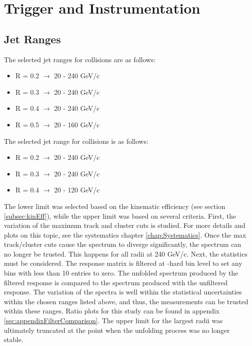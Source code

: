 \section{Trigger and Instrumentation}
\label{chap:TriggerAndInstrumentation}

\subsection{Jet \pT Ranges}
\label{sec:ptRanges}

The selected jet \pT ranges for \pp collisions are as follows:

\begin{itemize}
    \item R = 0.2 $\rightarrow$ 20 - 240 GeV/c
    \item R = 0.3 $\rightarrow$ 20 - 240 GeV/c
    \item R = 0.4 $\rightarrow$ 20 - 240 GeV/c
    \item R = 0.5 $\rightarrow$ 20 - 160 GeV/c
\end{itemize}

The selected jet \pT range for \pPb collisions is as follows:

\begin{itemize}
    \item R = 0.2 $\rightarrow$ 20 - 240 GeV/c
    \item R = 0.3 $\rightarrow$ 20 - 240 GeV/c
    \item R = 0.4 $\rightarrow$ 20 - 120 GeV/c
\end{itemize}

The lower limit was selected based on the kinematic efficiency (see section \ref{subsec:kinEff}), while the upper limit was based on several criteria. First, the variation of the maximum track and cluster \pT cuts is studied. For more details and plots on this topic, see the systematics chapter \ref{chap:Systematics}. Once the max track/cluster cuts cause the spectrum to diverge significantly, the spectrum can no longer be trusted. This happens for all radii at 240 GeV/c. Next, the statistics must be considered. The response matrix is filtered at \pT-hard bin level to set any bins with less than 10 entries to zero. The unfolded spectrum produced by the filtered response is compared to the spectrum produced with the unfiltered response. The variation of the spectra is well within the statistical uncertainties within the chosen ranges listed above, and thus, the measurements can be trusted within these ranges. Ratio plots for this study can be found in appendix \ref{sec:appendixFilterComparison}. The upper limit for the largest radii was ultimately truncated at the point when the unfolding process was no longer stable.

